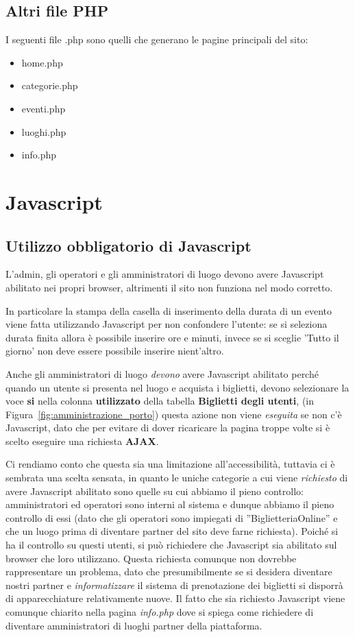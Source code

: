 \documentclass[10pt, a4paper]{article}
\begin{document}
\subsection{Altri file PHP}
I seguenti file .php sono quelli che generano le pagine principali del sito:
\begin{itemize}
  \item{home.php}
  \item{categorie.php}
  \item{eventi.php}
  \item{luoghi.php}
  \item{info.php}
\end{itemize}
\section{Javascript}
\subsection{Utilizzo obbligatorio di Javascript}
L'admin, gli operatori e gli amministratori di luogo devono avere
Javascript abilitato nei propri browser, altrimenti il sito non funziona nel modo corretto.

In particolare la stampa della casella di inserimento della durata di un evento viene fatta utilizzando Javascript per non confondere l'utente: se si seleziona durata finita allora è possibile inserire ore e minuti, invece se si sceglie 'Tutto il giorno' non deve essere possibile inserire nient'altro.

Anche gli amministratori di luogo \emph{devono} avere Javascript abilitato perché quando un utente
si presenta nel luogo e acquista i biglietti, devono selezionare la voce \textbf{si} nella colonna 
\textbf{utilizzato} della tabella \textbf{Biglietti degli utenti}, (in Figura~\ref{fig:amministrazione_porto})
questa azione non viene \emph{eseguita} se non c'è Javascript, dato che per evitare di dover ricaricare la pagina troppe volte si è scelto eseguire una richiesta \textbf{AJAX}.

Ci rendiamo conto che questa sia una limitazione all'accessibilità, tuttavia ci è sembrata una scelta sensata, in quanto le uniche categorie a cui viene \emph{richiesto} di avere Javascript abilitato sono quelle su cui abbiamo il pieno controllo: amministratori ed operatori sono interni al sistema e dunque abbiamo il pieno controllo di essi  (dato che gli operatori sono impiegati di ''BiglietteriaOnline'' e che un luogo prima di diventare partner del sito deve farne richiesta). Poiché si ha il controllo su questi utenti, si può richiedere che Javascript sia abilitato sul browser che loro utilizzano. Questa richiesta comunque non dovrebbe rappresentare un problema, dato che presumibilmente se si desidera diventare nostri partner e \emph{informatizzare} il sistema di prenotazione dei biglietti si disporrà di apparecchiature relativamente nuove. Il fatto che sia richiesto Javascript viene comunque chiarito nella pagina \emph{info.php} dove si spiega come richiedere di diventare amministratori di luoghi partner della piattaforma.
\end{document}
